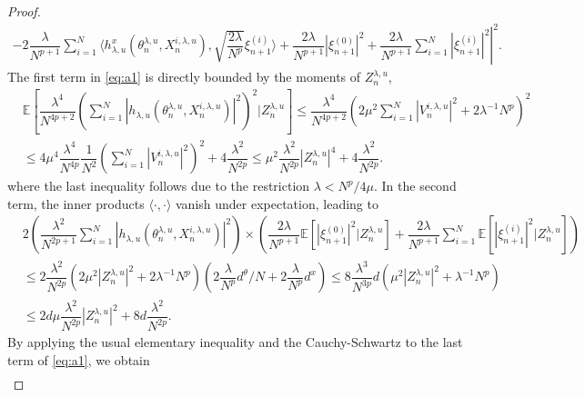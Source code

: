 \documentclass[a4paper, 10pt]{article}
\theoremstyle{plain}%
\begin{document}
\begin{proof}
\begin{gather}
\left.-2\dfrac{\lambda}{N^{p+1}}\sum_{i=1}^N\langle h^x_{\lambda,u}(\theta_n^{\lambda,u},X_n^{i,\lambda,u}),\sqrt{\dfrac{2\lambda}{N^p}}\xi_{n+1}^{(i)}  \rangle +\dfrac{2\lambda}{N^{p+1}}|\xi_{n+1}^{(0)}|^2+\dfrac{2\lambda}{N^{p+1}}\sum_{i=1}^N|\xi_{n+1}^{(i)} |^2\right|^2.\label{eq:a1}
\end{gather}
The first term in \eqref{eq:a1} is directly bounded by the moments of $Z^{\lambda,u}_{n}$,
\begin{align}
&\mathbb{E}\left[\dfrac{\lambda^4}{N^{4p+2}}\left(\sum_{i=1}^N|h_{\lambda,u}(\theta_n^{\lambda,u},X_n^{i,\lambda,u})|^2\right)^2|Z^{\lambda,u}_{n}\right]\leq \dfrac{\lambda^4}{N^{4p+2}}\left(2\mu^2\sum_{i=1}^N|V_n^{i,\lambda,u}|^2+2\lambda^{-1}N^p\right)^2\nonumber\\
&\leq 4\mu^4\dfrac{\lambda^4}{N^{4p}}\dfrac{1}{N^2}\left(\sum_{i=1}^N|V_n^{i,\lambda,u}|^2\right)^2+4\dfrac{\lambda^2}{N^{2p}}\leq \mu^2\dfrac{\lambda^2}{N^{2p}}|Z^{\lambda,u}_{n}|^4+4\dfrac{\lambda^2}{N^{2p}}.\label{b3}
\end{align}
where the last inequality follows due to the restriction $\lambda<N^p/4\mu$.
In the second term, the inner products $\langle\cdot,\cdot\rangle$ vanish under expectation, leading to
\begin{align}
&2\left(\dfrac{\lambda^2}{N^{2p+1}}\sum_{i=1}^N|h_{\lambda,u}(\theta_n^{\lambda,u},X_n^{i,\lambda,u})|^2\right)\times\left(\dfrac{2\lambda}{N^{p+1}}\mathbb{E}\left[|\xi_{n+1}^{(0)}|^2|Z^{\lambda,u}_{n}\right]+\dfrac{2\lambda}{N^{p+1}}\sum_{i=1}^N\mathbb{E}\left[|\xi_{n+1}^{(i)} |^2|Z^{\lambda,u}_{n}\right]\right)\nonumber\\&\leq 2\dfrac{\lambda^2}{N^{2p}}\left(2\mu^2|Z^{\lambda,u}_{n}|^2+2\lambda^{-1}N^p\right)\left(2\dfrac{\lambda}{N^p} d^{\theta}/N+2\dfrac{\lambda}{N^p} d^x\right)\leq 8\dfrac{\lambda^3}{N^{3p}} d(\mu^2|Z^{\lambda,u}_{n}|^2+\lambda^{-1}N^p)\nonumber\nonumber\\
&\leq 2d\mu \dfrac{\lambda^2}{N^{2p}}|Z^{\lambda,u}_{n}|^2+8d\dfrac{\lambda^2}{N^{2p}}.\label{eq:b1}
\end{align}
By applying the usual elementary inequality and the Cauchy-Schwartz to the last term of \eqref{eq:a1}, we obtain
\begin{align}

\end{align}
\end{proof}
\end{document}

